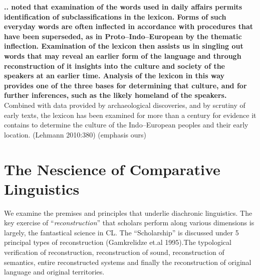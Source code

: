 \begin{myquote}
\textbf{.. noted that examination of the words used in daily affairs permits identification of subclassifications in the lexicon. Forms of such everyday words are often inflected in accordance with procedures that have been superseded, as in Proto–Indo–European by the thematic inflection. Examination of the lexicon then assists us in singling out words that may reveal an earlier form of the language and through reconstruction of it insights into the culture and society of the speakers at an earlier time. Analysis of the lexicon in this way provides one of the three bases for determining that culture, and for further inferences, such as the likely homeland of the speakers.} Combined with data provided by archaeological discoveries, and by scrutiny of early texts, the lexicon has been examined for more than a century for evidence it contains to determine the culture of the Indo–European peoples and their early location. (Lehmann 2010:380) (emphasis ours)
\end{myquote}


\section*{The Nescience of Comparative Linguistics}

We examine the premises and principles that underlie diachronic linguistics. The key exercise of “\textit{reconstruction}” that scholars perform along various dimensions is largely, the fantastical science in CL. The “Scholarship” is discussed under 5 principal types of reconstruction (Gamkrelidze et.al 1995).The typological verification of reconstruction, reconstruction of sound, reconstruction of semantics, entire reconstructed systems and finally the reconstruction of original language and original territories.

